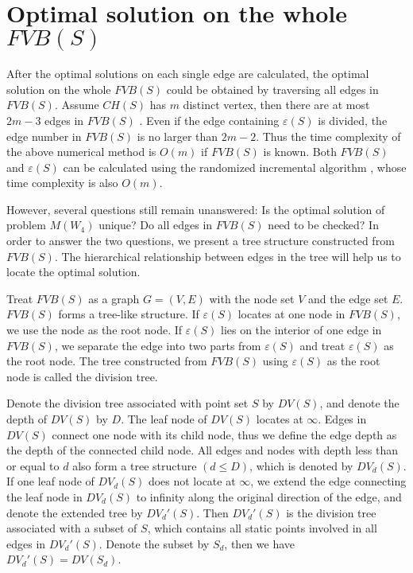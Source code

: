 \documentclass[final,3p,times]{elsarticle}
\begin{document}
\section{Optimal solution on the whole $FVB(S)$}
\label{section_center_function}

After the optimal solutions on each single edge are calculated, the optimal solution on the whole $FVB(S)$ could be obtained by traversing all edges in $FVB(S)$. Assume $CH(S)$ has $m$ distinct vertex, then there are at most $2m-3$ edges in $FVB(S)$ \cite{book2008CG}. Even if the edge containing $\varepsilon(S)$ is divided, the edge number in $FVB(S)$ is no larger than $2m-2$. Thus the time complexity of the above numerical method is $O(m)$ if $FVB(S)$ is known. Both $FVB(S)$ and $\varepsilon(S)$ can be calculated using the randomized incremental algorithm \cite{book2008CG}, whose time complexity is also $O(m)$.

However, several questions still remain unanswered: Is the optimal solution of problem $M(W_4)$ unique? Do all edges in $FVB(S)$ need to be checked? In order to answer the two questions, we present a tree structure constructed from $FVB(S)$. The hierarchical relationship between edges in the tree will help us to locate the optimal solution.
\begin{defn}
Treat $FVB(S)$ as a graph $G=(V,E)$ with the node set $V$ and the edge set $E$. $FVB(S)$ forms a tree-like structure. If $\varepsilon(S)$ locates at one node in $FVB(S)$, we use the node as the root node. If $\varepsilon(S)$ lies on the interior of one edge in $FVB(S)$, we separate the edge into two parts from $\varepsilon(S)$ and treat $\varepsilon(S)$ as the root node. The tree constructed from $FVB(S)$ using $\varepsilon(S)$ as the root node is called the division tree. %
\end{defn}
Denote the division tree associated with point set $S$ by $DV(S)$, and denote the depth of $DV(S)$ by $D$. The leaf node of $DV(S)$ locates at $\infty$. Edges in $DV(S)$ connect one node with its child node, thus we define the edge depth as the depth of the connected child node. All edges and nodes with depth less than or equal to $d$ also form a tree structure $(d\leq D)$, which is denoted by $DV_d(S)$. If one leaf node of $DV_d(S)$ does not locate at $\infty$, we extend the edge connecting the leaf node in $DV_d(S)$ to infinity along the original direction of the edge, and denote the extended tree by $DV_d'(S)$. Then $DV_d'(S)$ is the division tree associated with a subset of $S$, which contains all static points involved in all edges in $DV_d'(S)$. Denote the subset by $S_d$, then we have $DV_d'(S)=DV(S_d)$.
\end{document}
